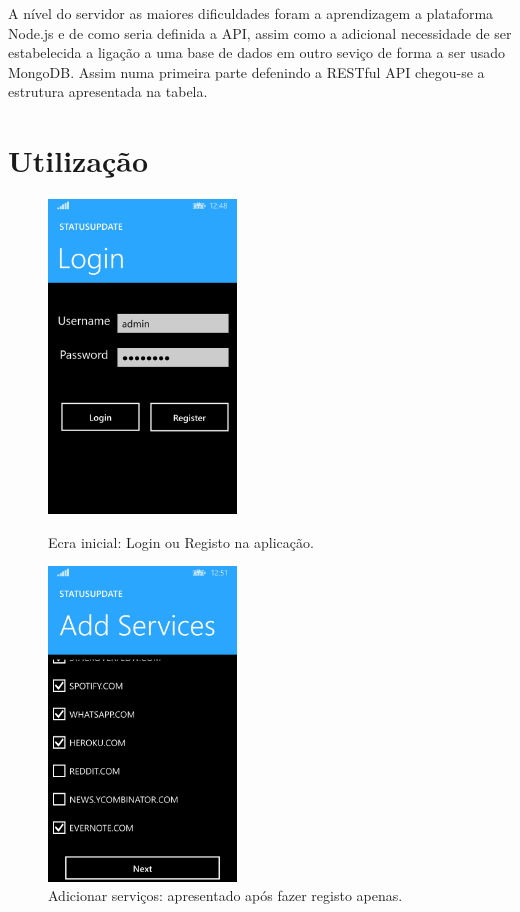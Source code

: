 \documentclass[12pt]{article}
\begin{document}
A nível do servidor as maiores dificuldades foram a aprendizagem a plataforma Node.js e de como seria definida a API, assim como a adicional necessidade de ser estabelecida a ligação a uma base de dados em outro seviço de forma a ser usado MongoDB. Assim numa primeira parte defenindo a RESTful API chegou-se a estrutura apresentada na tabela.


\section{Utilização} 
\begin{figure}[ht!]
\centering
\parbox{5cm}{
\includegraphics[width=5cm]{1.png}
\caption{Ecra inicial:  Login ou Registo na aplicação.}
}
\qquad
\begin{minipage}{5cm}
\includegraphics[width=5cm]{2.png}
\caption{Adicionar serviços: apresentado após fazer registo apenas.}
\end{minipage}
\end{figure}
\end{document}
